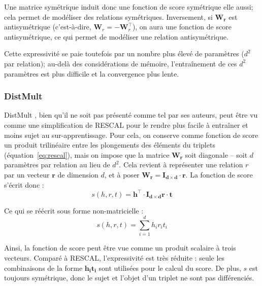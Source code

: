 Une matrice symétrique induit donc une fonction de score symétrique elle aussi; cela permet de modéliser des relations symétriques. Inversement, si $\mathbf{W_r}$ est antisymétrique (c'est-à-dire, $\mathbf{W}_r = -\mathbf{W}_r^\top$), on aura une fonction de score antisymétrique, ce qui permet de modéliser une relation antisymétrique.

Cette expressivité se paie toutefois par un nombre plus élevé de paramètres ($d^2$ par relation); au-delà des considérations de mémoire, l'entraînement de ces $d^2$ paramètres est plus difficile et la convergence plus lente.

\subsubsection{DistMult}

DistMult \cite{distmult}, bien qu'il ne soit pas présenté comme tel par ses auteurs, peut être vu comme une simplification de RESCAL pour le rendre plus facile à entraîner et moins sujet au sur-apprentissage. Pour cela, on conserve comme fonction de score un produit trilinéaire entre les plongements des éléments du triplets  (équation~\ref{eq:rescal}), mais on impose que la matrice $\mathbf{W_r}$ soit diagonale – soit $d$ paramètres par relation au lieu de $d^2$. Cela revient à représenter une relation $r$ par un vecteur $\mathbf{r}$ de dimension $d$, et à poser $\mathbf{W_r = I_{d\times d} \cdot r}$. La fonction de score s'écrit donc :
\begin{equation}
    \label{eq:distmult}
    s(h, r, t) = \mathbf{h^\top \cdot I_{d\times d}r \cdot t}
\end{equation}

Ce qui se réécrit sous forme non-matricielle :
\begin{equation}
    s(h, r, t) = \sum_{i=1}^{d} h_i r_i t_i
    \label{eq:kge-distmult-scorenv}
\end{equation}

Ainsi, la fonction de score peut être vue comme un produit scalaire à trois vecteurs. Comparé à RESCAL, l'expressivité est très réduite : seule les combinaisons de la forme $\mathbf{h_i t_i}$ sont utilisées pour le calcul du score. De plus, $s$ est toujours symétrique, donc le sujet et l'objet d'un triplet ne sont pas différenciés.



